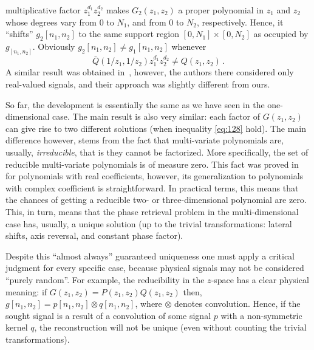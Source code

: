 multiplicative factor $z_{1}^{d_{1}}z_{2}^{d_{2}}$ makes $G_{2}(z_{1},
z_{2})$ a proper polynomial in $z_{1}$ and $z_{2}$ whose degrees vary
from $0$ to $N_{1}$, and from $0$ to $N_{2}$, respectively. Hence, it ``shifts''
$g_{2}[n_{1}, n_{2}]$ to the same support region $[0,N_{1}]\times
[0,N_{2}]$ as occupied by $g_[n_{1}, n_{2}]$. Obviously
$g_{2}[n_{1}, n_{2}]\not=g_{1}[n_{1}, n_{2}]$ whenever
\begin{equation}
  \label{eq:128}
  \bar Q(1/z_{1}, 1/z_{2})z_{1}^{d_{1}}z_{2}^{d_{2}}
  \not = Q(z_{1}, z_{2})\,. 
\end{equation}
A similar result was obtained in~,
however, the authors there considered only real-valued signals, and
their approach was slightly different from ours.

So far, the development is essentially the same as we have seen in the
one-dimensional case. The main result is also very similar: each
factor of $G(z_{1},z_{2})$ can give rise to two different solutions
(when inequality \eqref{eq:128} hold). The main difference however,
stems from the fact that multi-variate polynomials are, usually,
\emph{irreducible}, that is they cannot be factorized.
More specifically, the set of reducible
multi-variate polynomials is of measure zero. This fact was proved
in~ for polynomials with real coefficients,
however, its generalization to polynomials with complex coefficient
is straightforward. In practical terms, this means that the
chances of getting a reducible two- or three-dimensional polynomial are
zero. This, in turn, means that the phase retrieval problem in the
multi-dimensional case has, usually, a unique solution (up to the
trivial transformations: lateral shifts, axis reversal, and constant
phase factor).

Despite this ``almost always'' guaranteed uniqueness one must apply a
critical judgment for every specific case, because physical signals may
not be considered ``purely random''. For example, the reducibility in
the $z$-space has a clear physical meaning: if
$G(z_{1},z_{2})=P(z_{1},z_{2})Q(z_{1},z_{2})$ then, $g[n_{1},n_{2}] =
p[n_{1},n_{2}]\otimes q[n_{1},n_{2}]$, where $\otimes$ denotes
convolution. Hence, if the sought signal is a result of a convolution of
some signal $p$ with a non-symmetric kernel $q$, the reconstruction
will not be unique (even without counting the trivial
transformations).

